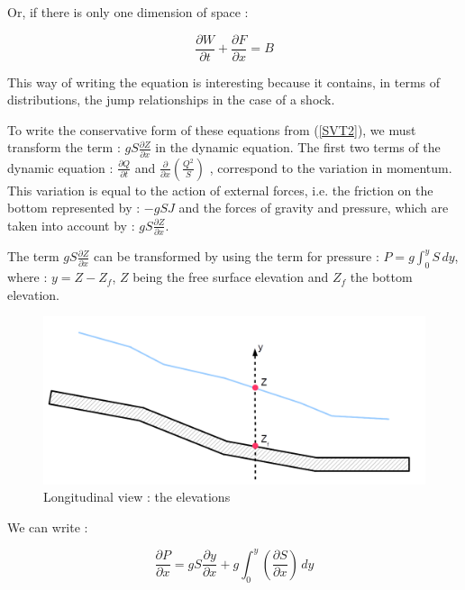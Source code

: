 Or, if there is only one dimension of space :

\begin{equation}
 \frac{\partial W}{\partial t} + \frac{\partial F}{\partial x} = B
\end{equation}

This way of writing the equation is interesting because it contains, in terms of distributions, the jump relationships in the case of a shock.

To write the conservative form of these equations from (\ref{SVT2}), we must transform the term : $g S \frac{\partial Z}{\partial x}$ in the dynamic equation. The first two terms of the dynamic equation : $\frac{\partial Q}{\partial t}$ and $\frac{\partial}{\partial x}\left ( \frac{Q^2}{S}\right )$ , correspond to the variation in momentum. This variation is equal to the action of external forces, i.e. the friction on the bottom represented by : $-g S J$ and the forces of gravity and pressure, which are taken into account by : $g S \frac{\partial Z}{\partial x}$.

The term $g S \frac{\partial Z}{\partial x}$ can be transformed by using the term for pressure : $P = g \int_{0}^{y} S \, dy$, where : $y = Z - Z_f$, $Z$ being the free surface elevation and $Z_f$ the bottom elevation.

\begin{figure}[H]
 \begin{center}
  \includegraphics[width=\textwidth]{Figures/VueLong2.png}
  \caption{Longitudinal view : the elevations}
 \end{center}
\end{figure}

We can write :

\begin{equation}
 \frac{\partial P}{\partial x} = g S \frac{\partial y}{\partial x} + g \int_{0}^y \left ( \frac{\partial S}{\partial x}\right ) \, dy
\end{equation}

